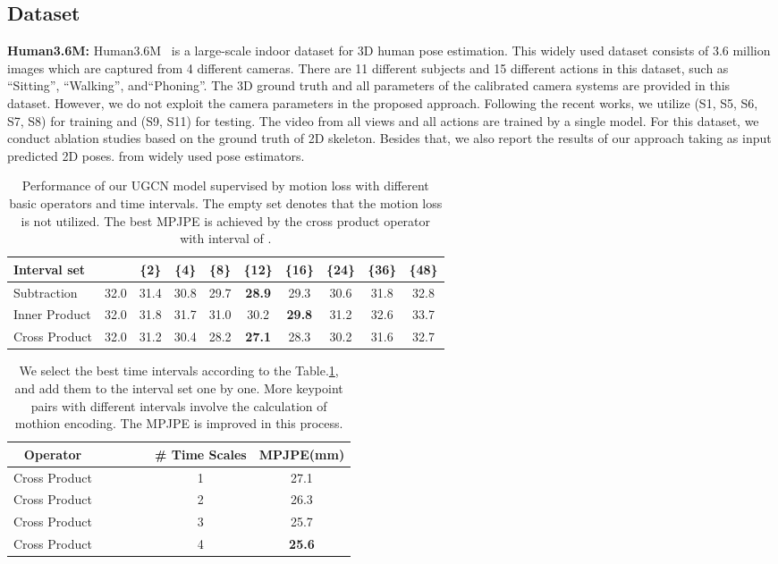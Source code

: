 \documentclass[runningheads]{llncs}
\begin{document}
\subsection{Dataset}
\textbf{Human3.6M:}
Human3.6M~\cite{h36m_pami} is a large-scale indoor dataset for 3D human pose estimation.
This widely used dataset consists of 3.6 million images which are captured from 4 different cameras.
There are 11 different subjects and 15 different actions in this dataset, such as ``Sitting'', ``Walking'', and``Phoning''.
The 3D ground truth and all parameters of the calibrated camera systems are provided in this dataset. However, we do not exploit the camera parameters in the proposed approach.
Following the recent works, we utilize (S1, S5, S6, S7, S8) for training and (S9, S11) for testing.
The video from all views and all actions are trained by a single model.
For this dataset, we conduct ablation studies based on the ground truth of 2D skeleton.
Besides that, we also report the results of our approach taking as input predicted 2D poses.
from widely used pose estimators.

\begin{table}
\scriptsize
    \centering
    \setlength{\tabcolsep}{0.6em}
    \caption {Performance of our UGCN model supervised by motion loss with different basic operators and time intervals. The empty set  denotes that the motion loss is not utilized.
    The best MPJPE is achieved by the cross product operator with interval of .}
    \label{tab: interval}
    \begin{tabular}{@{}l|ccccccccc@{}}
    \toprule
    Interval set   &  & \{2\} & \{4\} & \{8\} & \{12\} & \{16\} & \{24\} & \{36\} & \{48\}   \\
    \midrule
    Subtraction & 32.0 &31.4 & 30.8 & 29.7 & \textbf{28.9} & 29.3 & 30.6 & 31.8 & 32.8   \\
    Inner Product & 32.0&31.8 & 31.7 & 31.0 & 30.2 & \textbf{29.8} & 31.2 & 32.6 & 33.7   \\
    Cross Product & 32.0&31.2 & 30.4 & 28.2 & \textbf{27.1} & 28.3 & 30.2 & 31.6 & 32.7   \\
    \bottomrule
    \end{tabular}
\end{table}
\begin{table}
\scriptsize
\setlength{\tabcolsep}{0.6em}
\centering
\caption {We select the  best time intervals according to the Table.\ref{tab: interval},
and add them to the interval set one by one. More keypoint pairs with different intervals involve the calculation of mothion encoding.
The MPJPE is improved in this process.}
\label{tab: interval2}
\begin{tabular}{@{}c|cccc|c|c @{}}
\toprule
Operator  &  &   &   &  & \# Time Scales& MPJPE(mm)   \\
\midrule
  Cross Product &              &  &  &  & 1 &27.1 \\
  Cross Product &  &  &  &  & 2 &26.3 \\
  Cross Product &  &  &   &  & 3 &25.7  \\
  Cross Product &  &  &   &   & 4 &\textbf{25.6} \\
\bottomrule
\end{tabular}
\end{table}
\end{document}
